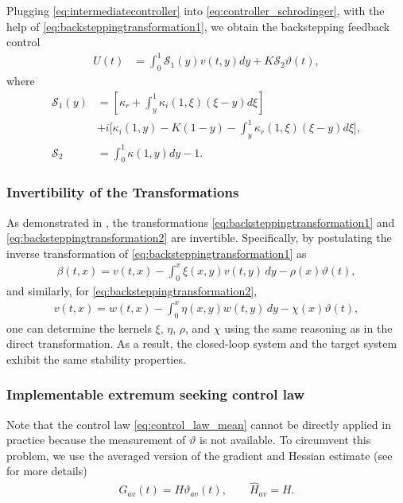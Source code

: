 \documentclass[letterpaper, 10 pt, conference]{ieeeconf}  %
\begin{document}
Plugging \eqref{eq:intermediatecontroller} into \eqref{eq:controller_schrodinger}, with the help of \eqref{eq:backsteppingtransformation1}, we obtain the backstepping feedback control
\begin{align}
    U(t) &= \int_{0}^{1}\mathcal{S}_{1} (y)v(t,y)dy +K\mathcal{S}_{2}\vartheta(t), \label{eq:control_law_mean}
\end{align}
\noindent where
\begin{align*}
    \mathcal{S}_{1} (y) &= \left[\kappa_{r}+\int_{y}^{1}\kappa_{i}(1,\xi)(\xi-y)d\xi\right] \\
    &+i\biggl[\kappa_{i}(1,y)-K(1-y)
    -\int_{y}^{1}\kappa_{r}(1,\xi)(\xi-y)d\xi\biggr],\\
    \mathcal{S}_{2} &= \int_{0}^{1}\kappa(1,y)dy-1.
\end{align*}

\subsubsection{Invertibility of the Transformations}
As demonstrated in \cite{Ren2013}, the transformations \eqref{eq:backsteppingtransformation1} and \eqref{eq:backsteppingtransformation2} are invertible. Specifically, by postulating the inverse transformation of \eqref{eq:backsteppingtransformation1} as
\begin{align*}
    \beta(t,x) = v(t,x) - \int_{0}^{x} \xi(x,y) v(t,y) \, dy - \rho(x) \vartheta(t),
\end{align*}
\noindent and similarly, for \eqref{eq:backsteppingtransformation2},
\begin{align*}
    v(t,x) = w(t,x) - \int_{0}^{x} \eta(x,y) w(t,y) \, dy - \chi(x) \vartheta(t),
\end{align*}
one can determine the kernels $\xi$, $\eta$, $\rho$, and $\chi$ using the same reasoning as in the direct transformation. As a result, the closed-loop system and the target system exhibit the same stability properties.

\subsubsection{Implementable extremum seeking control law}

Note that the control law \eqref{eq:control_law_mean} cannot be directly applied in practice because the measurement of $\vartheta$ is not available. To circumvent this problem, we use the averaged version of the gradient and Hessian estimate (see \cite{book2022} for more details)
\begin{align}
    G_{av}(t)=H\vartheta_{av}(t), \qquad \hat{H}_{av}=H.\label{eq:gradient_estimateav}
\end{align}
\end{document}

